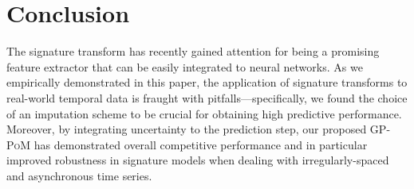 \documentclass{article}
\begin{document}
\section{Conclusion}

The signature transform has recently gained attention for being
a promising feature extractor that can be easily integrated to neural
networks. As we empirically demonstrated in this paper, the application
of signature transforms to real-world temporal data is fraught with
pitfalls---specifically, we found the choice of an imputation scheme to
be crucial for obtaining high predictive performance. Moreover, by
integrating uncertainty to the prediction step, our proposed
\textsc{GP-PoM} has demonstrated overall competitive performance and in
particular improved robustness in signature models when dealing with
irregularly-spaced and asynchronous time series. 



\end{document}
